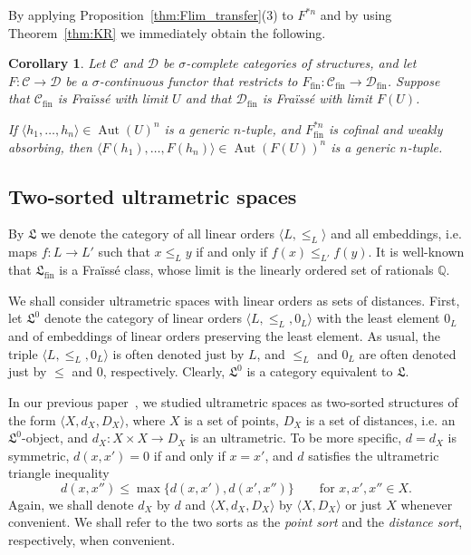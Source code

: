 \documentclass[oneside,notitlepage,12pt]{article}
\newtheorem{wn}[tw]{Corollary}
\theoremstyle{definition}
\theoremstyle{remark}
\newcommand \set [1]{\{#1\}}
\newcommand \seq [1]{\langle #1 \rangle}
\newcommand \map [3]{#1\colon #2 \to #3} %
\newcommand \maps {\colon} %
\newcommand \Q {\mathbb{Q}}
\newcommand \C {\mathscr{C}}
\newcommand \D {\mathscr{D}}
\newcommand \fin {{\operatorname{fin}}}
\newcommand \Lin {\mathfrak{L}}
\newcommand \Aut {\operatorname{Aut}}
\begin{document}
By applying Proposition~\ref{thm:Flim_transfer}(3) to $F^{*n}$ and by using Theorem~\ref{thm:KR} we immediately obtain the following.

\begin{wn} \label{thm:generic_transfer}
    Let $\C$ and $\D$ be $\sigma$-complete categories of structures, and let $F\maps \C \to \D$ be a $\sigma$-continuous functor that restricts to $F_\fin\maps \C_\fin \to \D_\fin$.
    Suppose that $\C_\fin$ is Fraïssé with limit $U$ and that $\D_\fin$ is Fraïssé with limit $F(U)$.
    
    If $\seq{h_1, \ldots, h_n} \in \Aut(U)^n$ is a generic $n$-tuple, and $F^{*n}_\fin$ is cofinal and weakly absorbing, then $\seq{F(h_1), \ldots, F(h_n)} \in \Aut(F(U))^n$ is a generic $n$-tuple.
\end{wn}




\subsection{Two-sorted ultrametric spaces}\label{prel:2sort}

By $\Lin$ we denote the category of all linear orders $\seq{L, \leq_L}$ and all embeddings, i.e. maps $f\maps L \to L'$ such that $x \leq_L y$ if and only if $f(x) \leq_{L'} f(y)$.
It is well-known that $\Lin_\fin$ is a Fraïssé class, whose limit is the linearly ordered set of rationals $\Q$.

We shall consider ultrametric spaces with linear orders as sets of distances.
First, let $\Lin^0$ denote the category of linear orders $\seq{L, \leq_L, 0_L}$ with the least element $0_L$ and of embeddings of linear orders preserving the least element.
As usual, the triple $\seq{L, \leq_L, 0_L}$ is often denoted just by $L$, and $\leq_L$ and $0_L$ are often denoted just by $\leq$ and $0$, respectively.
Clearly, $\Lin^0$ is a category equivalent to $\Lin$.

In our previous paper~\cite{paper1}, we studied ultrametric spaces as two-sorted structures of the form $\seq{X, d_X, D_X}$,
where $X$ is a set of points, $D_X$ is a set of distances, i.e. an $\Lin^0$-object, and $\map{d_X}{X \times X}{D_X}$ is an ultrametric.
To be more specific, $d = d_X$ is symmetric, $d(x, x') = 0$ if and only if $x = x'$, and $d$ satisfies the ultrametric triangle inequality 
\[
    d(x, x'') \leq \max\set{d(x,x'), d(x',x'')} \qquad \text{for $x,x',x'' \in X$.}
\]
Again, we shall denote $d_X$ by $d$ and $\seq{X, d_X, D_X}$ by $\seq{X, D_X}$ or just $X$ whenever convenient.
We shall refer to the two sorts as the \emph{point sort} and the \emph{distance sort}, respectively, when convenient.
\end{document}
